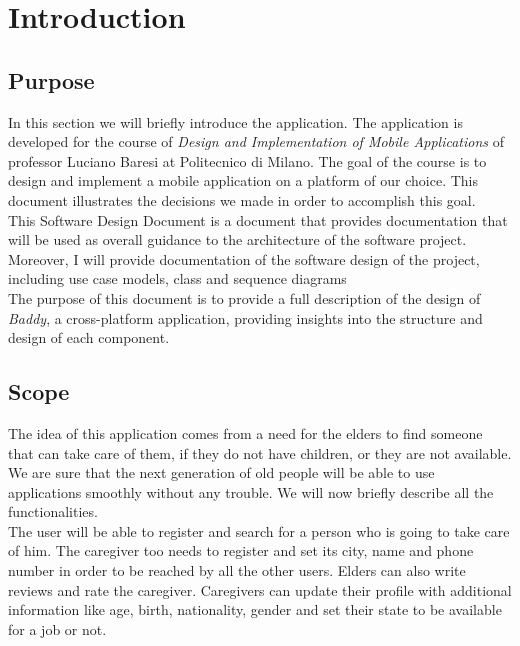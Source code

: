 \documentclass[../../dd.tex]{subfiles}
\begin{document}
\chapter{Introduction}
\section{Purpose}
    In this section we will briefly introduce the application.
    The application is developed for
    the course of \textit{Design and Implementation of Mobile Applications} of professor Luciano Baresi
    at Politecnico di Milano.
    The goal of the course is to design and implement a mobile application on
    a platform of our choice.
    This document illustrates the decisions we made in
    order to accomplish this goal.
    \\

    This Software Design Document is a document that provides documentation that will be used as
    overall guidance to the architecture of the software project.
    Moreover, I will provide documentation of the software design of the
    project, including use case models, class and sequence diagrams
    \\

    The purpose of this document is to provide a full description of the design of \textit{Baddy},
    a cross-platform application, providing insights into the structure and design of each component.

    \section{Scope}
    The idea of this application comes from a need for the elders to find someone that can take care of them,
    if they do not have children, or they are not available.
    We are sure that the next generation of old people will be able to use applications smoothly without any trouble.
    We will now briefly describe all the functionalities.
    \\

    The user will be able to register and search for a person who is going to take care of him.
    The caregiver too needs to register and set its city, name and phone number in order to be reached by all
    the other users.
    Elders can also write reviews and rate the caregiver.
    Caregivers can update their profile with additional information like age, birth, nationality, gender and set their
    state to be available for a job or not.
\end{document}
